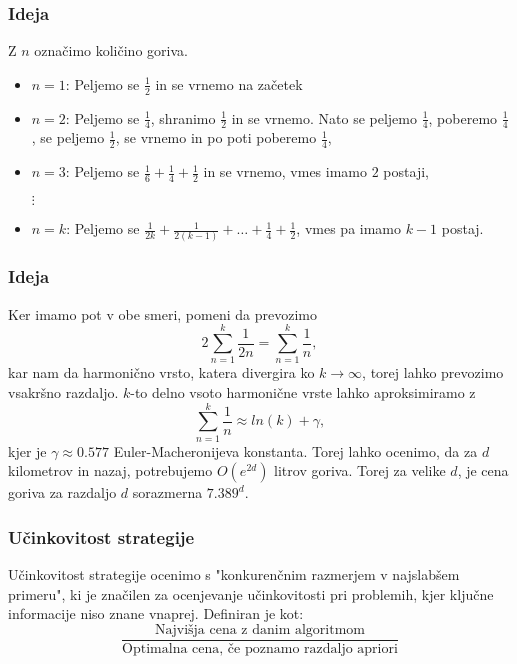 \documentclass{beamer}
\begin{document}
 \begin{frame}
     \frametitle{Ideja}
     Z $n$ označimo količino goriva.
     \begin{itemize}
        \item $n = 1$: Peljemo se $\frac{1}{2}$ in se vrnemo na začetek
        \item $n = 2$: Peljemo se $\frac{1}{4}$, shranimo $\frac{1}{2}$ in se vrnemo. Nato se peljemo $\frac{1}{4}$, poberemo $\frac{1}{4}$, se peljemo 
        $\frac{1}{2}$, se vrnemo in po poti poberemo $\frac{1}{4}$,
        \item $n = 3$: Peljemo se $\frac{1}{6} + \frac{1}{4} + \frac{1}{2}$ in se vrnemo, vmes imamo $2$ postaji,
        \item[{$\vdots$}]
        \item $n = k$: Peljemo se $\frac{1}{2k} + \frac{1}{2(k-1)} + \dots + \frac{1}{4} + \frac{1}{2}$, vmes pa imamo $k - 1$ postaj.

     \end{itemize}

 \end{frame}
 
 \begin{frame}
    \frametitle{Ideja}
    Ker imamo pot v obe smeri, pomeni da prevozimo  
    $$2\sum_{n=1}^{k} \frac{1}{2n} = \sum_{n=1}^{k} \frac{1}{n},$$
    kar nam da harmonično vrsto, katera divergira ko $k \to \infty$, torej lahko prevozimo 
    vsakršno razdaljo. $k$-to delno vsoto harmonične vrste lahko aproksimiramo z 
    $$\sum_{n=1}^{k} \frac{1}{n} \approx ln(k) + \gamma,$$ kjer je $\gamma \approx 0.577$ Euler-Macheronijeva konstanta.
    Torej lahko ocenimo, da za $d$ kilometrov in nazaj, potrebujemo $O(e^{2d})$ litrov goriva. Torej za velike $d$, je cena 
    goriva za razdaljo $d$ sorazmerna $7.389^d$.
\end{frame}

 \begin{frame}
    \frametitle{Učinkovitost strategije}
    Učinkovitost strategije ocenimo s "konkurenčnim razmerjem v najslabšem primeru", ki je značilen za ocenjevanje učinkovitosti pri 
    problemih, kjer ključne informacije niso znane vnaprej. Definiran je kot: 
    $$\frac{\text{Najvišja cena z danim algoritmom}}{\text{Optimalna cena, če poznamo razdaljo apriori}} $$
\end{frame}
\end{document}
